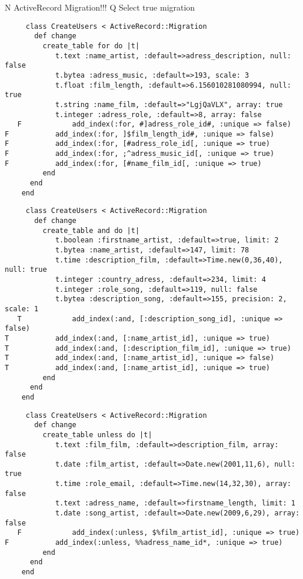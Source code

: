 N
ActiveRecord Migration!!!
Q
Select true migration
	\begin{verbatim}
   	 class CreateUsers < ActiveRecord::Migration
	   def change
	     create_table for do |t|
			t.text :name_artist, :default=>adress_description, null: false
   			t.bytea :adress_music, :default=>193, scale: 3
   			t.float :film_length, :default=>6.156010281080994, null: true
   			t.string :name_film, :default=>"LgjQaVLX", array: true
   			t.integer :adress_role, :default=>8, array: false
   F			add_index(:for, #]adress_role_id#, :unique => false)
F			add_index(:for, ]$film_length_id#, :unique => false)
F			add_index(:for, [#adress_role_id[, :unique => true)
F			add_index(:for, ;^adress_music_id[, :unique => true)
F			add_index(:for, [#name_film_id[, :unique => true)
	     end
	  end 
    end
    \end{verbatim}

	\begin{verbatim}
   	 class CreateUsers < ActiveRecord::Migration
	   def change
	     create_table and do |t|
			t.boolean :firstname_artist, :default=>true, limit: 2
   			t.bytea :name_artist, :default=>147, limit: 78
   			t.time :description_film, :default=>Time.new(0,36,40), null: true
   			t.integer :country_adress, :default=>234, limit: 4
   			t.integer :role_song, :default=>119, null: false
   			t.bytea :description_song, :default=>155, precision: 2, scale: 1
   T			add_index(:and, [:description_song_id], :unique => false)
T			add_index(:and, [:name_artist_id], :unique => true)
T			add_index(:and, [:description_film_id], :unique => true)
T			add_index(:and, [:name_artist_id], :unique => false)
T			add_index(:and, [:name_artist_id], :unique => true)
	     end
	  end 
    end
    \end{verbatim}

	\begin{verbatim}
   	 class CreateUsers < ActiveRecord::Migration
	   def change
	     create_table unless do |t|
			t.text :film_film, :default=>description_film, array: false
   			t.date :film_artist, :default=>Date.new(2001,11,6), null: true
   			t.time :role_email, :default=>Time.new(14,32,30), array: false
   			t.text :adress_name, :default=>firstname_length, limit: 1
   			t.date :song_artist, :default=>Date.new(2009,6,29), array: false
   F			add_index(:unless, $%film_artist_id], :unique => true)
F			add_index(:unless, %%adress_name_id*, :unique => true)
	     end
	  end 
    end
    \end{verbatim}

